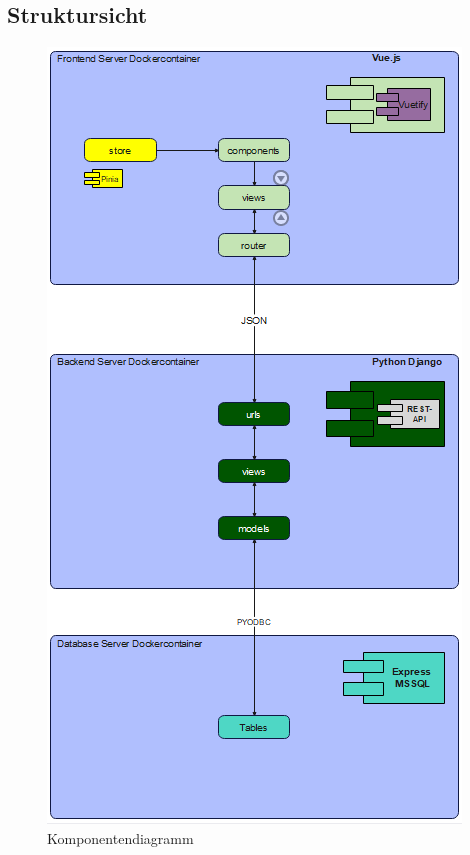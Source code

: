 \documentclass{article}
\begin{document}
    \subsection{ Struktursicht}
        \begin{figure}[h]
            \centering
            \includegraphics[scale=0.85]{images/Struktursicht.png}
            \caption{Komponentendiagramm}
            \label{fig:beispiel}
        \end{figure}
    \newpage
\end{document}
